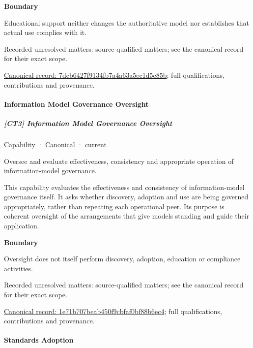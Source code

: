 \textbf{Boundary}



Educational support neither changes the authoritative model nor establishes that actual use complies with it.


{\small Recorded unresolved matters: source-qualified matters; see the canonical record for their exact scope.}\par
{\footnotesize \href{../../../../continuum/strategy/capability/7dcb6427f9134fb7a4a63a5ec1d5c85b.md}{Canonical record: 7dcb6427f9134fb7a4a63a5ec1d5c85b}; full qualifications, contributions and provenance.}\par
\paragraph{Information Model Governance Oversight}

\subparagraph{[CT3] Information Model Governance Oversight}

\label{element:1e71b707beab450f9cbfaf0bf88b6ec4}
{\small Capability · Canonical · current}\par

Oversee and evaluate effectiveness, consistency and appropriate operation of information-model governance.



This capability evaluates the effectiveness and consistency of information-model governance itself. It asks whether discovery, adoption and use are being governed appropriately, rather than repeating each operational peer. Its purpose is coherent oversight of the arrangements that give models standing and guide their application.



\textbf{Boundary}



Oversight does not itself perform discovery, adoption, education or compliance activities.


{\small Recorded unresolved matters: source-qualified matters; see the canonical record for their exact scope.}\par
{\footnotesize \href{../../../../continuum/strategy/capability/1e71b707beab450f9cbfaf0bf88b6ec4.md}{Canonical record: 1e71b707beab450f9cbfaf0bf88b6ec4}; full qualifications, contributions and provenance.}\par
\paragraph{Standards Adoption}

